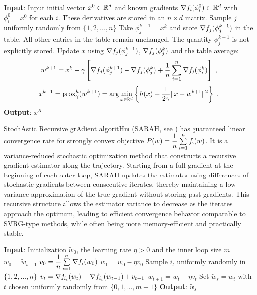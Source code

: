\begin{algorithm}[ht]
\caption{SAGA: minimizing $P(x)=\dfrac{1}{n}\sum\li_{i=1}^n f_i(x)$}
\label{Alg:SAGA}
\begin{algorithmic}[1]
\STATE \textbf{Input}: Input initial vector $x^0\in \mathbb R^d$ and known gradients $\nabla f_i(\phi_i^0)\in \mathbb R^d$ with $\phi_i^0=x^0$
                        for each $i$. These derivatives are stored in an $n\times d$ matrix.
    \STATE Sample $j$ uniformly randomly from $\{1,2,...,n\}$
    \STATE Take $\phi_j^{k+1}=x^k$ and store $\nabla f_j(\phi_j^{k+1})$ in the table. 
            All other entries in the table remain unchanged. The quantity $\phi_j^{k+1}$ is not explicitly stored.
    \STATE Update $x$ using $\nabla f_j(\phi_j^{k+1})$, $\nabla f_j(\phi_j^k)$ and the table average:
            $$w^{k+1}=x^k-\gamma \left[\nabla f_j(\phi_j^{k+1})-\nabla f_j(\phi_j^k)
                +\dfrac{1}{n}\sum\limits_{i=1}^n \nabla f_j(\phi_i^k)\right] \ ,$$
                $$x^{k+1}=\text{prox}_\gamma^h (w^{k+1})=\text{arg}\min\limits_{x\in \mathbb R^d}\left\{h(x)+\dfrac{1}{2\gamma}\|x-w^{k+1}\|^2\right\} \ .$$
\ENDFOR
\STATE \textbf{Output}: $x^K$
\end{algorithmic}
\end{algorithm}


StochAstic Recursive grAdient algoritHm (SARAH, see \cite{SARAHpaper}) has guaranteed linear convergence rate for strongly convex objective $P(w)=\dfrac{1}{n}\sum\li_{i=1}^n f_i(w)$. It is a variance-reduced stochastic optimization method that constructs a recursive gradient estimator along the trajectory. Starting from a full gradient at the beginning of each outer loop, SARAH updates the estimator using differences of stochastic gradients between consecutive iterates, thereby maintaining a low-variance approximation of the true gradient without storing past gradients. This recursive structure allows the estimator variance to decrease as the iterates approach the optimum, leading to efficient convergence behavior comparable to SVRG-type methods, while often being more memory-efficient and practically stable.

\begin{algorithm}[ht!]
\caption{StochAstic Recursive grAdient algoritHm (SARAH): minimizing $P(w)=\dfrac{1}{n}\sum\li_{i=1}^n f_i(w)$}
\label{Alg:SARAH}
\begin{algorithmic}[1]
\STATE \textbf{Input}: Initialization $\widetilde{w}_0$, the learning rate $\eta>0$ and the inner loop size $m$
    \STATE $w_0=\widetilde{w}_{s-1}$
    \STATE $v_0=\dfrac{1}{n}\sum\limits_{i=1}^n \nabla f_i(w_0)$
    \STATE $w_1=w_0-\eta v_0$
        \STATE Sample $i_t$ uniformly randomly in $\{1,2,...,n\}$
        \STATE $v_t=\nabla f_{i_t}(w_t)-\nabla f_{i_t}(w_{t-1})+v_{t-1}$
        \STATE $w_{t+1}=w_t-\eta v_t$
    \ENDFOR
    \STATE Set $\widetilde{w}_s=w_t$ with $t$ chosen uniformly randomly from $\{0,1,...,m-1\}$
\ENDFOR
\STATE \textbf{Output}: $\widetilde{w}_s$
\end{algorithmic}
\end{algorithm}


